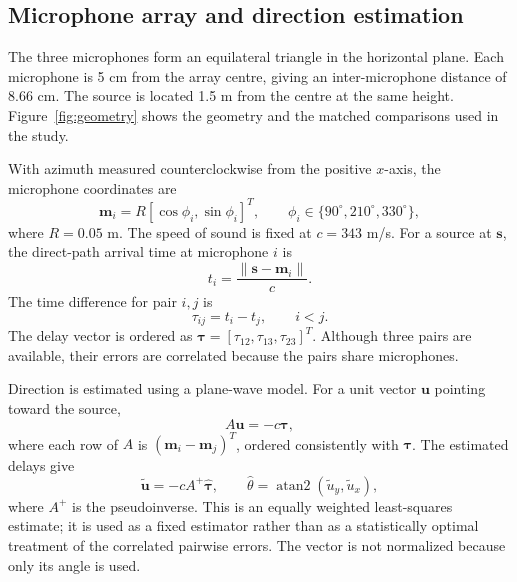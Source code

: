 \documentclass{edpsci}
\begin{document}
\subsection{Microphone array and direction estimation}

The three microphones form an equilateral triangle in the horizontal plane. Each microphone is 5 cm from the array centre, giving an inter-microphone distance of 8.66 cm. The source is located 1.5 m from the centre at the same height. Figure~\ref{fig:geometry} shows the geometry and the matched comparisons used in the study.

With azimuth measured counterclockwise from the positive $x$-axis, the microphone coordinates are
\begin{equation}
	\mathbf{m}_i
	=
	R[\cos\phi_i,\sin\phi_i]^T,
	\qquad
	\phi_i\in\{90^\circ,210^\circ,330^\circ\},
\end{equation}
where $R=0.05$ m. The speed of sound is fixed at $c=343$ m/s. For a source at $\mathbf{s}$, the direct-path arrival time at microphone $i$ is
\begin{equation}
	t_i=\frac{\lVert\mathbf{s}-\mathbf{m}_i\rVert}{c}.
\end{equation}
The time difference for pair $i,j$ is
\begin{equation}
	\tau_{ij}=t_i-t_j,\qquad i<j.
\end{equation}
The delay vector is ordered as
$\boldsymbol{\tau}=[\tau_{12},\tau_{13},\tau_{23}]^T$.
Although three pairs are available, their errors are correlated because the pairs share microphones.

Direction is estimated using a plane-wave model. For a unit vector $\mathbf{u}$ pointing toward the source,
\begin{equation}
	A\mathbf{u}=-c\boldsymbol{\tau},
\end{equation}
where each row of $A$ is $(\mathbf{m}_i-\mathbf{m}_j)^T$, ordered consistently with $\boldsymbol{\tau}$. The estimated delays give
\begin{equation}
	\widetilde{\mathbf{u}}
	=
	-cA^+\widehat{\boldsymbol{\tau}},
	\qquad
	\widehat{\theta}
	=
	\operatorname{atan2}
	(\widetilde{u}_y,\widetilde{u}_x),
	\label{eq:solve}
\end{equation}
where $A^+$ is the pseudoinverse. This is an equally weighted least-squares estimate; it is used as a fixed estimator rather than as a statistically optimal treatment of the correlated pairwise errors. The vector is not normalized because only its angle is used.
\end{document}
